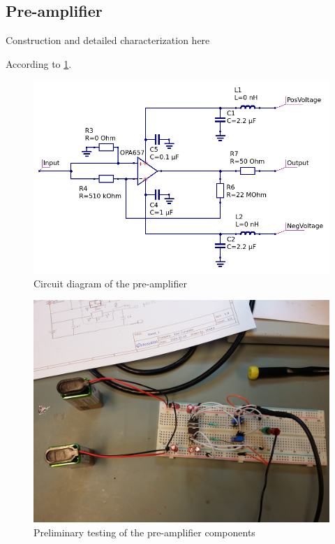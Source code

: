 \documentclass[a4paper]{article}
\begin{document}
\clearpage
\begin{appendices}

\section{Pre-amplifier}
\label{pre_amp}

Construction and detailed characterization here

According to \ref{fig:pre_amp_schematic}.

\begin{figure}[ht!]
\centering
\includegraphics[width=\textwidth]{fig/amp-schematic/amplifier.png}
\caption{Circuit diagram of the pre-amplifier}
\label{fig:pre_amp_schematic}
\end{figure}

\begin{figure}[ht!]
\centering
\includegraphics[width=\textwidth]{fig/IMG_20201005_104331.jpg}
\caption{Preliminary testing of the pre-amplifier components}
\end{figure}



\end{appendices}
\end{document}
